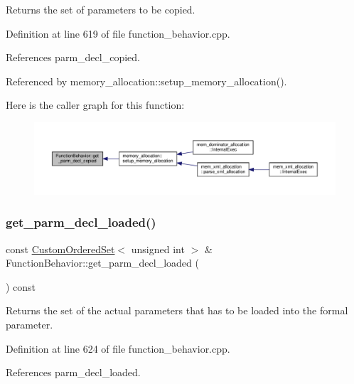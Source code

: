 Returns the set of parameters to be copied. 



Definition at line 619 of file function\+\_\+behavior.\+cpp.



References parm\+\_\+decl\+\_\+copied.



Referenced by memory\+\_\+allocation\+::setup\+\_\+memory\+\_\+allocation().

Here is the caller graph for this function\+:
\nopagebreak
\begin{figure}[H]
\begin{center}
\leavevmode
\includegraphics[width=350pt]{d9/d45/classFunctionBehavior_ac629d472b15dbc6c1ccf88a15602edac_icgraph}
\end{center}
\end{figure}
\mbox{\label{classFunctionBehavior_a93a9a59f4fdc831007c3ec616a9ca3a2}} 
\subsubsection{\texorpdfstring{get\+\_\+parm\+\_\+decl\+\_\+loaded()}{get\_parm\_decl\_loaded()}}
{\footnotesize\ttfamily const \hyperlink{classCustomOrderedSet}{Custom\+Ordered\+Set}$<$ unsigned int $>$ \& Function\+Behavior\+::get\+\_\+parm\+\_\+decl\+\_\+loaded (\begin{DoxyParamCaption}{ }\end{DoxyParamCaption}) const}



Returns the set of the actual parameters that has to be loaded into the formal parameter. 



Definition at line 624 of file function\+\_\+behavior.\+cpp.



References parm\+\_\+decl\+\_\+loaded.



